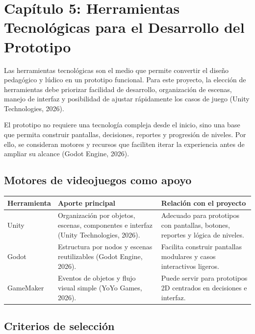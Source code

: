 \section[Cap\'{i}tulo 5: Herramientas Tecnol\'{o}gicas para el Desarrollo del Prototipo]{\centering Cap\'{i}tulo 5: Herramientas Tecnol\'{o}gicas para el Desarrollo del Prototipo}

Las herramientas tecnol\'{o}gicas son el medio que permite convertir el dise\~{n}o pedag\'{o}gico y l\'{u}dico en un prototipo funcional. Para este proyecto, la elecci\'{o}n de herramientas debe priorizar facilidad de desarrollo, organizaci\'{o}n de escenas, manejo de interfaz y posibilidad de ajustar r\'{a}pidamente los casos de juego (Unity Technologies, 2026).

El prototipo no requiere una tecnolog\'{i}a compleja desde el inicio, sino una base que permita construir pantallas, decisiones, reportes y progresi\'{o}n de niveles. Por ello, se consideran motores y recursos que faciliten iterar la experiencia antes de ampliar su alcance (Godot Engine, 2026).

\subsection{Motores de videojuegos como apoyo}

\begin{center}
\begin{tabular}{|p{}|p{}|p{}|}
\hline
\textbf{Herramienta} & \textbf{Aporte principal} & \textbf{Relaci\'{o}n con el proyecto} \\
\hline
Unity & Organizaci\'{o}n por objetos, escenas, componentes e interfaz (Unity Technologies, 2026). & Adecuado para prototipos con pantallas, botones, reportes y l\'{o}gica de niveles. \\
\hline
Godot & Estructura por nodos y escenas reutilizables (Godot Engine, 2026). & Facilita construir pantallas modulares y casos interactivos ligeros. \\
\hline
GameMaker & Eventos de objetos y flujo visual simple (YoYo Games, 2026). & Puede servir para prototipos 2D centrados en decisiones e interfaz. \\
\hline
\end{tabular}
\end{center}

\subsection{Criterios de selecci\'{o}n}

